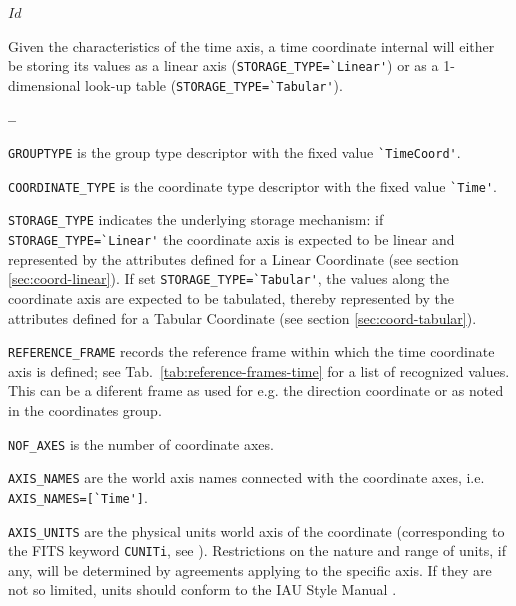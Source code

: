 \svnInfo $Id$


Given the characteristics of the time axis, a time coordinate internal
will either be storing its values as a linear axis
(\verb|STORAGE_TYPE=`Linear'|) or as a 1-dimensional look-up table
(\verb|STORAGE_TYPE=`Tabular'|).



\begin{list}{\textbf{--}}{}
\item \verb|GROUPTYPE| is the group type descriptor with the fixed
  value \verb|`TimeCoord'|.
\item \verb|COORDINATE_TYPE| is the coordinate type descriptor with
  the fixed value \verb|`Time'|.
\item \verb|STORAGE_TYPE| indicates the underlying storage mechanism: if 
  \verb|STORAGE_TYPE=`Linear'| the coordinate axis is expected to be linear and
  represented by the attributes defined for a Linear Coordinate (see section
  \ref{sec:coord-linear}). If set \verb|STORAGE_TYPE=`Tabular'|, the values along
  the coordinate axis are expected to be tabulated, thereby represented by the
  attributes defined for a Tabular Coordinate (see section
  \ref{sec:coord-tabular}).

\item \verb|REFERENCE_FRAME| records the reference frame within which
  the time coordinate axis is defined; see
  Tab.~\ref{tab:reference-frames-time} for a list of recognized
  values. This can be a diferent frame as used for e.g. the direction
  coordinate or as noted in the coordinates group. 
\item \verb|NOF_AXES| is the number of coordinate axes.
\item \verb|AXIS_NAMES| are the world axis names connected with the
  coordinate axes, i.e. \verb|AXIS_NAMES=[`Time']|.
\item \verb|AXIS_UNITS| are the physical units world axis of the coordinate
  (corresponding to the FITS keyword \verb|CUNITi|, see \cite{fits.paper1}).
  Restrictions on the nature and range of units, if any, will be determined by
  agreements applying to the specific axis. If they are not so limited, units
  should conform to the IAU Style Manual \cite{mcnally.1988}.
\end{list}
